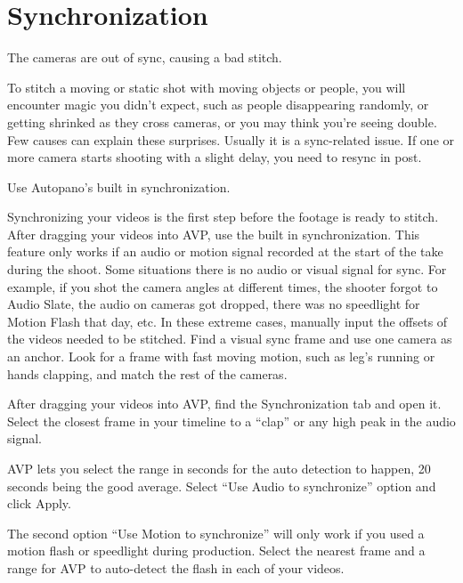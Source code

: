 \chapter{Synchronization}
\pagecolor{white}
\label{chap:33}
\begin{fullwidth}


\problem

{\large The cameras are out of sync, causing a bad stitch. \par}

To stitch a moving or static shot with moving objects or people, you will encounter magic you didn’t expect, such as people disappearing randomly, or getting shrinked as they cross cameras, or you may think you’re seeing double. Few causes can explain these surprises. Usually it is a sync-related issue. If one or more camera starts shooting with a slight delay, you need to resync in post.

\solutions

{\large Use Autopano’s built in synchronization. \par}

Synchronizing your videos is the first step before the footage is ready to stitch. After dragging your videos into AVP, use the built in synchronization. This feature only works if an audio or motion signal recorded at the start of the take during the shoot. Some situations there is no audio or visual signal for sync. For example, if you shot the camera angles at different times, the shooter forgot to Audio Slate, the audio on cameras got dropped, there was no speedlight for Motion Flash that day, etc. In these extreme cases, manually input the offsets of the videos needed to be stitched. Find a visual sync frame and use one camera as an anchor. Look for a frame with fast moving motion, such as leg’s running or hands clapping, and match the rest of the cameras.

After dragging your videos into AVP, find the Synchronization tab and open it. Select the closest frame in your timeline to a “clap” or any high peak in the audio signal. 

AVP lets you select the range in seconds for the auto detection to happen, 20 seconds being the good average. Select “Use Audio to synchronize” option and click Apply.

The second option “Use Motion to synchronize” will only work if you used a motion flash or speedlight during production. Select the nearest frame and a range for AVP to auto-detect the flash in each of your videos.



\end{fullwidth}
